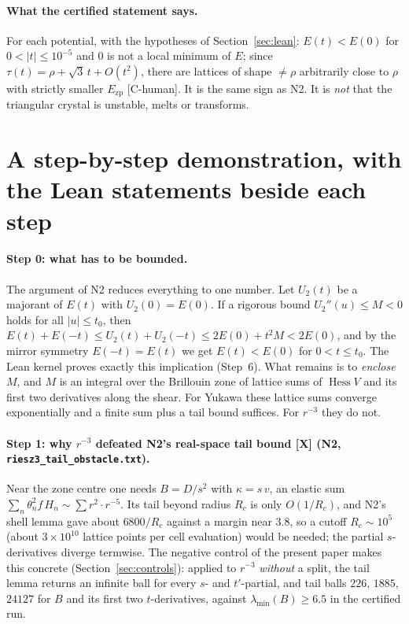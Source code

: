 \documentclass[11pt]{article}
\newcommand{\tier}[1]{\textsf{[#1]}}
\newcommand{\tCh}{\tier{C-human}}
\newcommand{\tX}{\tier{X}}
\newcommand{\Ezp}{E_{\mathrm{zp}}}
\newcommand{\hess}{\operatorname{Hess}}
\begin{document}
\paragraph{What the certified statement says.} For each potential, with the hypotheses of Section~\ref{sec:lean}: $E(t)<E(0)$ for $0<|t|\le10^{-5}$ and $0$ is not a local minimum of $E$; since $\tau(t)=\rho+\sqrt3\,t+O(t^2)$, there are lattices of shape $\ne\rho$ arbitrarily close to $\rho$ with strictly smaller $\Ezp$ \tCh. It is the same sign as N2. It is \emph{not} that the triangular crystal is unstable, melts or transforms.

\section{A step-by-step demonstration, with the Lean statements beside each step}\label{sec:human}
\paragraph{Step 0: what has to be bounded.} The argument of N2 reduces everything to one number. Let $U_2(t)$ be a majorant of $E(t)$ with $U_2(0)=E(0)$. If a rigorous bound $U_2''(u)\le M<0$ holds for all $|u|\le t_0$, then $E(t)+E(-t)\le U_2(t)+U_2(-t)\le 2E(0)+t^2M<2E(0)$, and by the mirror symmetry $E(-t)=E(t)$ we get $E(t)<E(0)$ for $0<t\le t_0$. The Lean kernel proves exactly this implication (Step~6). What remains is to \emph{enclose $M$}, and $M$ is an integral over the Brillouin zone of lattice sums of $\hess V$ and its first two derivatives along the shear. For Yukawa these lattice sums converge exponentially and a finite sum plus a tail bound suffices. For $r^{-3}$ they do not.

\paragraph{Step 1: why $r^{-3}$ defeated N2's real-space tail bound \tX{} (N2, \texttt{riesz3\_tail\_obstacle.txt}).} Near the zone centre one needs $B=D/s^2$ with $\kappa=s\,v$, an elastic sum $\sum_n\theta_n^2f\,H_n\sim\sum r^2\cdot r^{-5}$. Its tail beyond radius $R_c$ is only $O(1/R_c)$, and N2's shell lemma gave about $6800/R_c$ against a margin near $3.8$, so a cutoff $R_c\sim10^5$ (about $3\times10^{10}$ lattice points per cell evaluation) would be needed; the partial $s$-derivatives diverge termwise. The negative control of the present paper makes this concrete (Section~\ref{sec:controls}): applied to $r^{-3}$ \emph{without} a split, the tail lemma returns an infinite ball for every $s$- and $t'$-partial, and tail balls $226$, $1885$, $24127$ for $B$ and its first two $t$-derivatives, against $\lambda_{\min}(B)\ge6.5$ in the certified run.
\end{document}
